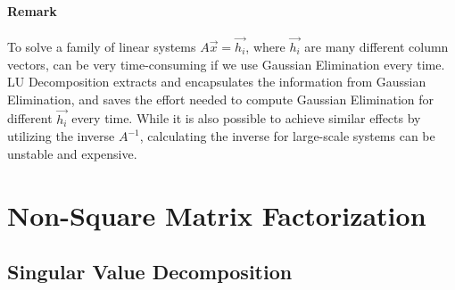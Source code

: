 \paragraph{Remark} To solve a family of linear systems $A\vec{x} = \vec{h_i}$, where $\vec{h_i}$ are many different column vectors, can be very time-consuming if we use Gaussian Elimination every time. LU Decomposition extracts and encapsulates the information from Gaussian Elimination, and saves the effort needed to compute Gaussian Elimination for different $\vec{h_i}$ every time. While it is also possible to achieve similar effects by utilizing the inverse $A^{-1}$, calculating the inverse for large-scale systems can be unstable and expensive.

\section{Non-Square Matrix Factorization}

\subsection{Singular Value Decomposition}

